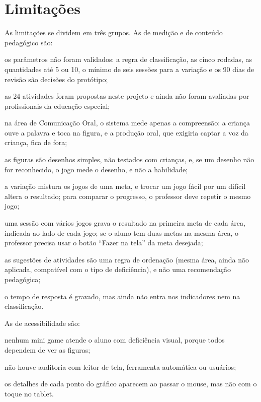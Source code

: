\section{Limitações}\label{sec:5.4}

As limitações se dividem em três grupos. As de medição e de conteúdo pedagógico são:

\begin{alineasIFTO}
  \item os parâmetros não foram validados: a regra de classificação, as cinco rodadas, as quantidades até 5 ou 10, o mínimo de seis sessões para a variação e os 90 dias de revisão são decisões do protótipo;
  \item as 24 atividades foram propostas neste projeto e ainda não foram avaliadas por profissionais da educação especial;
  \item na área de Comunicação Oral, o sistema mede apenas a compreensão: a criança ouve a palavra e toca na figura, e a produção oral, que exigiria captar a voz da criança, fica de fora;
  \item as figuras são desenhos simples, não testados com crianças, e, se um desenho não for reconhecido, o jogo mede o desenho, e não a habilidade;
  \item a variação mistura os jogos de uma meta, e trocar um jogo fácil por um difícil altera o resultado; para comparar o progresso, o professor deve repetir o mesmo jogo;
  \item uma sessão com vários jogos grava o resultado na primeira meta de cada área, indicada ao lado de cada jogo; se o aluno tem duas metas na mesma área, o professor precisa usar o botão “Fazer na tela” da meta desejada;
  \item as sugestões de atividades são uma regra de ordenação (mesma área, ainda não aplicada, compatível com o tipo de deficiência), e não uma recomendação pedagógica;
  \item o tempo de resposta é gravado, mas ainda não entra nos indicadores nem na classificação.
\end{alineasIFTO}

As de acessibilidade são:

\begin{alineasIFTO}
  \item nenhum mini game atende o aluno com deficiência visual, porque todos dependem de ver as figuras;
  \item não houve auditoria com leitor de tela, ferramenta automática ou usuários;
  \item os detalhes de cada ponto do gráfico aparecem ao passar o mouse, mas não com o toque no tablet.
\end{alineasIFTO}

